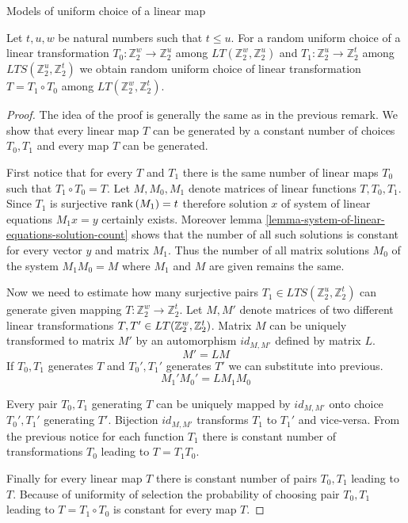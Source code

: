 \begin{section}{Models of uniform choice of a linear map}
\begin{remark}
\label{remark-model-uniform-linear-map-selection}
Let $t, u, w$ be natural numbers such that $t \leq u$. For a random uniform choice of a linear transformation $T_0: \mathbb{Z}_2^w \rightarrow \mathbb{Z}_2^u$ among $LT(\mathbb{Z}_2^w, \mathbb{Z}_2^u)$ and $T_1: \mathbb{Z}_2^u \rightarrow \mathbb{Z}_2^t$ among $LTS(\mathbb{Z}_2^u, \mathbb{Z}_2^t)$ we obtain random uniform choice of linear transformation $T = T_1 \circ T_0$ among $LT(\mathbb{Z}_2^w, \mathbb{Z}_2^t)$.
\end{remark}
\begin{proof}
The idea of the proof is generally the same as in the previous remark. We show that every linear map $T$ can be generated by a constant number of choices $T_0, T_1$ and every map $T$ can be generated.

First notice that for every $T$ and $T_1$ there is the same number of linear maps $T_0$ such that $T_1 \circ T_0 = T$. Let $M, M_0, M_1$ denote matrices of linear functions $T, T_0, T_1$. Since $T_1$ is surjective $\mathrm{rank}\left({M_1}\right) = t$ therefore solution $x$ of system of linear equations $M_1 x = y$ certainly exists. Moreover lemma \ref{lemma-system-of-linear-equations-solution-count} shows that the number of all such solutions is constant for every vector $y$ and matrix $M_1$. Thus the number of all matrix solutions $M_0$ of the system $M_1 M_0 = M$ where $M_1$ and $M$ are given remains the same.

Now we need to estimate how many surjective pairs $T_1 \in LTS(\mathbb{Z}_2^u, \mathbb{Z}_2^t)$ can generate given mapping $T: \mathbb{Z}_2^w \rightarrow \mathbb{Z}_2^t$. Let $M, M'$ denote matrices of two different linear transformations $T, T' \in LT(\mathbb{Z}_{2}^{w}, \mathbb{Z}_{2}^{t})$. Matrix $M$ can be uniquely transformed to matrix $M'$ by an automorphism $id_{M, M'}$ defined by matrix $L$.
\[
	M' = LM
\]
If $T_0, T_1$ generates $T$ and $T_0', T_1'$ generates $T'$ we can substitute into previous.
\[
	M_1' M_0' = L M_1 M_0
\]

Every pair $T_0, T_1$ generating $T$ can be uniquely mapped by $id_{M, M'}$ onto choice $T_0', T_1'$ generating $T'$. Bijection $id_{M, M'}$ transforms $T_1$ to $T_1'$ and vice-versa. From the previous notice for each function $T_1$ there is constant number of transformations $T_0$ leading to $T = T_1 T_0$.

Finally for every linear map $T$ there is constant number of pairs $T_0, T_1$ leading to $T$. Because of uniformity of selection the probability of choosing pair $T_0, T_1$ leading to $T = T_1 \circ T_0$ is constant for every map $T$.
\end{proof}


\end{section}
